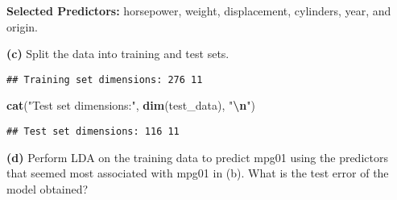 \documentclass[
]{article}
\newenvironment{Shaded}{\begin{snugshade}}{\end{snugshade}}
\newcommand{\AttributeTok}[1]{\textcolor[rgb]{0.13,0.29,0.53}{#1}}
\newcommand{\ConstantTok}[1]{\textcolor[rgb]{0.56,0.35,0.01}{#1}}
\newcommand{\DecValTok}[1]{\textcolor[rgb]{0.00,0.00,0.81}{#1}}
\newcommand{\FloatTok}[1]{\textcolor[rgb]{0.00,0.00,0.81}{#1}}
\newcommand{\FunctionTok}[1]{\textcolor[rgb]{0.13,0.29,0.53}{\textbf{#1}}}
\newcommand{\NormalTok}[1]{#1}
\newcommand{\OtherTok}[1]{\textcolor[rgb]{0.56,0.35,0.01}{#1}}
\newcommand{\SpecialCharTok}[1]{\textcolor[rgb]{0.81,0.36,0.00}{\textbf{#1}}}
\newcommand{\StringTok}[1]{\textcolor[rgb]{0.31,0.60,0.02}{#1}}
\begin{document}
\textbf{Selected Predictors:} horsepower, weight, displacement,
cylinders, year, and origin.

\textbf{(c)} Split the data into training and test sets.

\begin{Shaded}
\end{Shaded}

\begin{verbatim}
## Training set dimensions: 276 11
\end{verbatim}

\begin{Shaded}
\begin{Highlighting}[]
\FunctionTok{cat}\NormalTok{(}\StringTok{"Test set dimensions:"}\NormalTok{, }\FunctionTok{dim}\NormalTok{(test\_data), }\StringTok{"}\SpecialCharTok{\textbackslash{}n}\StringTok{"}\NormalTok{)}
\end{Highlighting}
\end{Shaded}

\begin{verbatim}
## Test set dimensions: 116 11
\end{verbatim}

\textbf{(d)} Perform LDA on the training data to predict mpg01 using the
predictors that seemed most associated with mpg01 in (b). What is the
test error of the model obtained?
\end{document}
